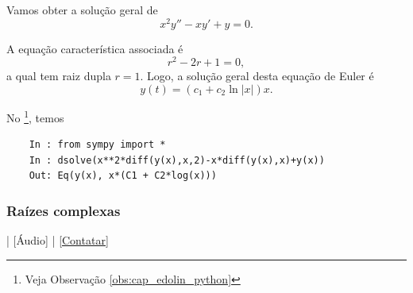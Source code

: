 \begin{ex}
  Vamos obter a solução geral de
  \begin{equation}
    x^2y'' - xy' + y = 0.
  \end{equation}

  A equação característica associada é
  \begin{equation}
    r^2 -2r + 1 = 0,
  \end{equation}
  a qual tem raiz dupla $r = 1$. Logo, a solução geral desta equação de Euler é
  \begin{equation}
    y(t) = (c_1 + c_2\ln|x|)x.
  \end{equation}

  \ifispython
  No \python\footnote{Veja Observação \ref{obs:cap_edolin_python}}, temos
  \begin{lstlisting}
    In : from sympy import *
    In : dsolve(x**2*diff(y(x),x,2)-x*diff(y(x),x)+y(x))
    Out: Eq(y(x), x*(C1 + C2*log(x)))
  \end{lstlisting}
  \fi  
\end{ex}

\subsubsection{Raízes complexas}

\begin{flushright}
  [Vídeo] | [Áudio] | \href{https://phkonzen.github.io/notas/contato.html}{[Contatar]}
\end{flushright}

